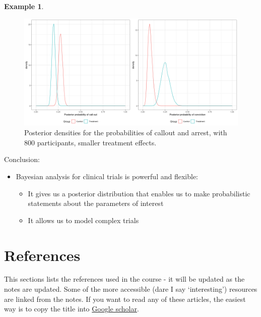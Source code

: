 \documentclass[
  openany]{book}
\providecommand{\tightlist}{%
  \setlength{\itemsep}{0pt}\setlength{\parskip}{0pt}}
\theoremstyle{definition}
\theoremstyle{definition}
\newtheorem{example}{Example}[chapter]
\theoremstyle{definition}
\theoremstyle{definition}
\theoremstyle{remark}
\begin{document}
\begin{example}
\begin{figure}
\includegraphics[width=1\linewidth]{images/ggpost800_55} \caption{Posterior densities for the probabilities of callout and arrest, with 800 participants, smaller treatment effects.}\label{fig:check800-55}
\end{figure}

\end{example}

Conclusion:

\begin{itemize}
\tightlist
\item
  Bayesian analysis for clinical trials is powerful and flexible:

  \begin{itemize}
  \tightlist
  \item
    It gives us a posterior distribution that enables us to make probabilistic statements about the parameters of interest
  \item
    It allows us to model complex trials
  \end{itemize}
\end{itemize}

\hypertarget{references}{%
\chapter*{References}\label{references}}

This sections lists the references used in the course - it will be updated as the notes are updated. Some of the more accessible (dare I say `interesting') resources are linked from the notes. If you want to read any of these articles, the easiest way is to copy the title into \href{https://scholar.google.co.uk/}{Google scholar}.

  
\end{document}

